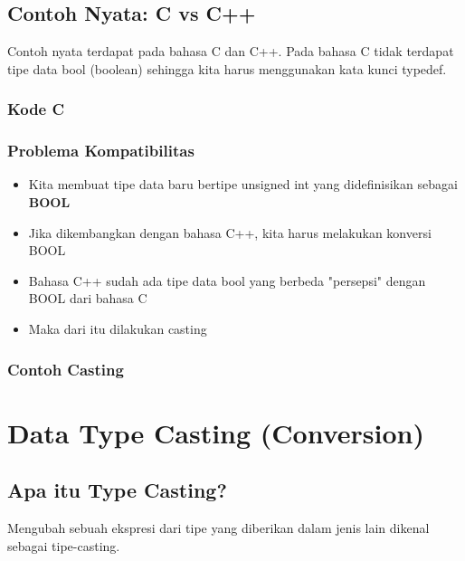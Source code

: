 \subsection{Contoh Nyata: C vs C++}

Contoh nyata terdapat pada bahasa C dan C++. Pada bahasa C tidak terdapat tipe data bool (boolean) sehingga kita harus menggunakan kata kunci typedef.

\subsubsection{Kode C}



\subsubsection{Problema Kompatibilitas}

\begin{itemize}
\item Kita membuat tipe data baru bertipe unsigned int yang didefinisikan sebagai \textbf{BOOL}
\item Jika dikembangkan dengan bahasa C++, kita harus melakukan konversi BOOL
\item Bahasa C++ sudah ada tipe data bool yang berbeda "persepsi" dengan BOOL dari bahasa C
\item Maka dari itu dilakukan casting
\end{itemize}

\subsubsection{Contoh Casting}



\section{Data Type Casting (Conversion)}\label{data-type-casting-conversion}

\subsection{Apa itu Type Casting?}

Mengubah sebuah ekspresi dari tipe yang diberikan dalam jenis lain dikenal sebagai tipe-casting.

